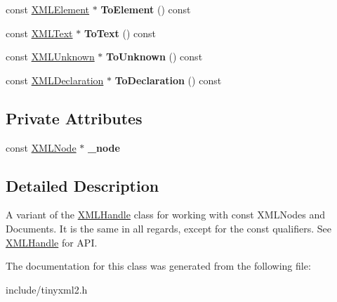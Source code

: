 \begin{DoxyCompactItemize}
const \mbox{\hyperlink{classtinyxml2_1_1XMLElement}{X\+M\+L\+Element}} $\ast$ {\bfseries To\+Element} () const
\item 
\mbox{\label{classtinyxml2_1_1XMLConstHandle_a80e24d90d476005aa35602a665358e2d}} 
const \mbox{\hyperlink{classtinyxml2_1_1XMLText}{X\+M\+L\+Text}} $\ast$ {\bfseries To\+Text} () const
\item 
\mbox{\label{classtinyxml2_1_1XMLConstHandle_a4395e5feaba7b456a81ca274880ea3d3}} 
const \mbox{\hyperlink{classtinyxml2_1_1XMLUnknown}{X\+M\+L\+Unknown}} $\ast$ {\bfseries To\+Unknown} () const
\item 
\mbox{\label{classtinyxml2_1_1XMLConstHandle_a55e306d105fa80d626041e4d3b77b716}} 
const \mbox{\hyperlink{classtinyxml2_1_1XMLDeclaration}{X\+M\+L\+Declaration}} $\ast$ {\bfseries To\+Declaration} () const
\end{DoxyCompactItemize}
\subsection*{Private Attributes}
\begin{DoxyCompactItemize}
\item 
\mbox{\label{classtinyxml2_1_1XMLConstHandle_ad4d8db839660ef730adfa2439945c4da}} 
const \mbox{\hyperlink{classtinyxml2_1_1XMLNode}{X\+M\+L\+Node}} $\ast$ {\bfseries \+\_\+node}
\end{DoxyCompactItemize}


\subsection{Detailed Description}
A variant of the \mbox{\hyperlink{classtinyxml2_1_1XMLHandle}{X\+M\+L\+Handle}} class for working with const X\+M\+L\+Nodes and Documents. It is the same in all regards, except for the \textquotesingle{}const\textquotesingle{} qualifiers. See \mbox{\hyperlink{classtinyxml2_1_1XMLHandle}{X\+M\+L\+Handle}} for A\+PI. 

The documentation for this class was generated from the following file\+:\begin{DoxyCompactItemize}
\item 
include/tinyxml2.\+h\end{DoxyCompactItemize}
